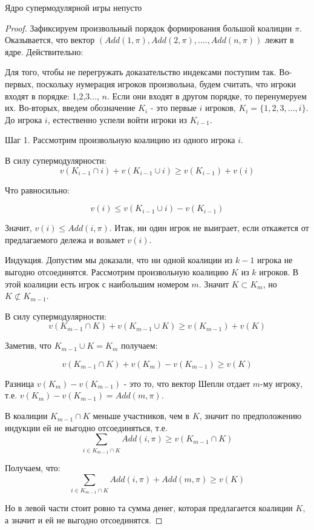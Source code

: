 \begin{myth}
Ядро супермодулярной игры непусто
\end{myth}
\begin{proof}

Зафиксируем произвольный порядок формирования большой коалиции $\pi$. Оказывается, что вектор $(Add(1,\pi),Add(2,\pi),....,Add(n,\pi))$ лежит в ядре. Действительно:

Для того, чтобы не перегружать доказательство индексами поступим так. Во-первых, поскольку нумерация игроков произвольна, будем считать, что игроки входят в порядке: 1,2,3..., $n$. Если они входят в другом порядке, то перенумеруем их. Во-вторых, введем обозначение $K_{i}$ - это первые $i$ игроков, $K_{i}=\{1,2,3,...,i\}$. До игрока $i$, естественно успели войти игроки из $K_{i-1}$.

Шаг 1. Рассмотрим произвольную коалицию из одного игрока $i$.

В силу супермодулярности: 
\begin{equation}
v(K_{i-1}\cap i)+v(K_{i-1}\cup i)\geq v(K_{i-1})+v(i) 
\end{equation}

Что равносильно: 

\begin{equation}
v(i)\leq v(K_{i-1}\cup i)-v(K_{i-1})
\end{equation}

Значит, $v(i)\leq Add(i,\pi)$.
Итак, ни один игрок не выиграет, если откажется от предлагаемого дележа и возьмет $v(i)$.

Индукция. Допустим мы доказали, что ни одной коалиции из $k-1$ игрока не выгодно отсоединятся. Рассмотрим произвольную коалицию $K$ из $k$ игроков. В этой коалиции есть игрок с наибольшим номером $m$. Значит $K\subset K_{m}$, но $K\not \subset K_{m-1}$. 

В силу супермодулярности:
\begin{equation}
v(K_{m-1}\cap K)+v(K_{m-1}\cup K)\geq v(K_{m-1})+v(K) 
\end{equation}

Заметив, что $K_{m-1}\cup K=K_{m}$ получаем:

\begin{equation}
v(K_{m-1}\cap K)+v(K_{m})-v(K_{m-1})\geq v(K) 
\end{equation}

Разница $v(K_{m})-v(K_{m-1})$ - это то, что вектор Шепли отдает $m$-му игроку, т.е. $v(K_{m})-v(K_{m-1})=Add(m,\pi)$.

В коалиции $K_{m-1}\cap K$ меньше участников, чем в $K$, значит по предположению индукции ей не выгодно отсоединяться, т.е.
\begin{equation}
\sum_{i\in K_{m-1}\cap K}Add(i,\pi)\geq v(K_{m-1}\cap K)
\end{equation}

Получаем, что:
\begin{equation}
\sum_{i\in K_{m-1}\cap K}Add(i,\pi) + Add(m,\pi)\geq v(K)
\end{equation}

Но в левой части стоит ровно та сумма денег, которая предлагается коалиции $K$, а значит и ей не выгодно отсоединятся.
\end{proof}

